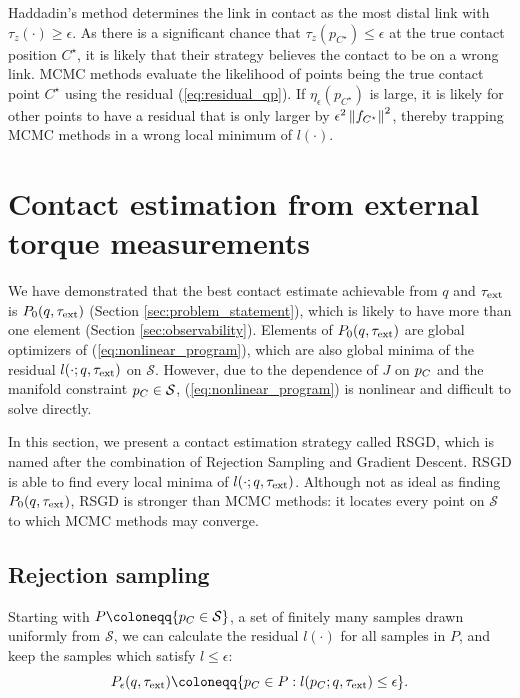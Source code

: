 Haddadin's method \cite{haddadin2017robot} determines the link in contact as the most distal link with $\tau_z(\cdot) \geq \epsilon$. As there is a significant chance that $\tau_z(p_{C^\star}) \leq \epsilon$ at the true contact position $C^\star$, it is likely that their strategy believes the contact to be on a wrong link. MCMC methods \cite{manuelli2016localizing, zwiener2019armcl} evaluate the likelihood of points being the true contact point $C^\star$ using the residual (\ref{eq:residual_qp}). If $\eta_\epsilon(p_{C^\star})$ is large, it is likely for other points to have a residual that is only larger by $\epsilon^2 \left\lVert{f_{C^\star}}\right\rVert^2$, thereby trapping MCMC methods in a wrong local minimum of $l(\cdot)$. 

\section{Contact estimation from external torque measurements}
We have demonstrated that the best contact estimate achievable from $q$ and $\tau_{\text{ext}}$ is $P_0(q, \tau_{\text{ext}})$ (Section \ref{sec:problem_statement}), which is likely to have more than one element (Section \ref{sec:observability}). Elements of $P_0(q, \tau_{\text{ext}})$ are global optimizers of (\ref{eq:nonlinear_program}), which are also global minima of the residual $l(\cdot; q, \tau_{\text{ext}})$ on $\mathcal{S}$. However, due to the dependence of ${J}$ on $p_{C}$ and the manifold constraint $p_{C} \in \mathcal{S}$, (\ref{eq:nonlinear_program}) is nonlinear and difficult to solve directly.

In this section, we present a contact estimation strategy called RSGD, which is named after the combination of Rejection Sampling and Gradient Descent. RSGD is able to find every local minima of $l(\cdot; q, \tau_{\text{ext}})$. Although not as ideal as finding $P_{0}(q, \tau_{\text{ext}})$, RSGD is stronger than MCMC methods: it locates every point on $\mathcal{S}$ to which MCMC methods may converge.

\subsection{Rejection sampling}
Starting with $P \coloneqq \{\pCbar \in \mathcal{S} \}$, a set of finitely many samples drawn uniformly from $\mathcal{S}$, we can calculate the residual $l(\cdot)$ for all samples in $P$, and keep the samples which satisfy $ l \leq \epsilon$:
\begin{equation}
P_{\epsilon}(q, \tauE) \coloneqq \{\pCbar \in P : l(\pCbar; q, \tauE) \leq \epsilon\}. 
\end{equation}

